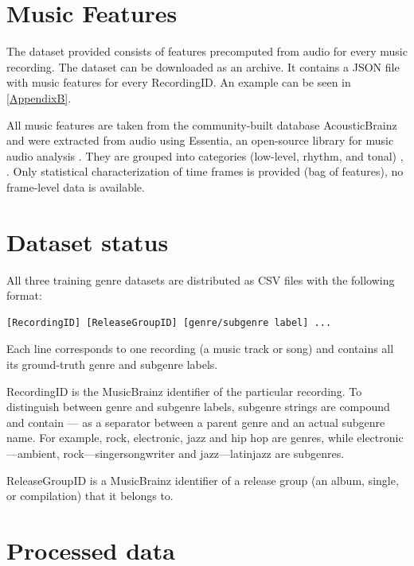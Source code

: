\section{Music Features}

The dataset provided consists of features precomputed from audio for every music recording. 
The dataset can be downloaded as an archive. 
It contains a JSON\cite{json} file with music features for every RecordingID. 
An example can be seen in \ref{AppendixB}.

All music features are taken from the community-built database AcousticBrainz and were extracted from audio using Essentia, an open-source library for music audio analysis \cite{essentia}. 
They are grouped into categories (low-level, rhythm, and tonal) \cite{essentiafeatures}, \cite{Bogdanov2013}. 
Only statistical characterization of time frames is provided (bag of features), no frame-level data is available.


\section{Dataset status}

All three training genre datasets are distributed as CSV files with the following format:

\begin{lstlisting}[caption=CSV Ground Truth]
[RecordingID] [ReleaseGroupID] [genre/subgenre label] ...
\end{lstlisting}

Each line corresponds to one recording (a music track or song) and contains all its ground-truth genre and subgenre labels. 

RecordingID is the MusicBrainz identifier of the particular recording. 
To distinguish between genre and subgenre labels, subgenre strings are compound and contain --- as a separator between a parent genre and an actual subgenre name. 
For example, rock, electronic, jazz and hip hop are genres, 
while electronic---ambient, rock---singersongwriter and jazz---latinjazz are subgenres.

ReleaseGroupID is a MusicBrainz identifier of a release group (an album, single, or compilation) that it belongs to. 


\section{Processed data}

